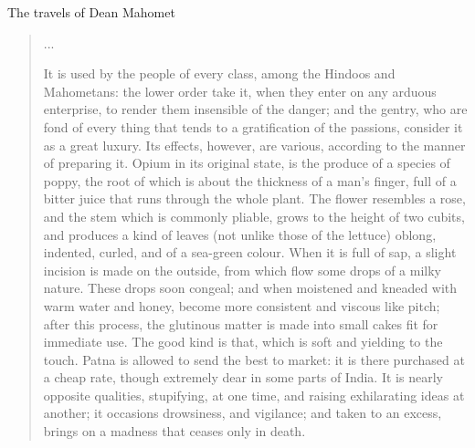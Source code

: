 \begin{texts}{The travels of Dean Mahomet}
\begin{quote}
    ...
    
    It is used by the people of every class, among the Hindoos and Mahometans: the lower order take it, when they enter on any arduous enterprise, to render them insensible of the danger; and the gentry, who are fond of every thing that tends to a gratification of the passions, consider it as a great luxury. Its effects, however, are various, according to the manner of preparing it. Opium in its original state, is the produce of a species of poppy, the root of which is about the thickness of a man's finger, full of a bitter juice that runs through the whole plant. The flower resembles a rose, and the stem which is commonly pliable, grows to the height of two cubits, and produces a kind of leaves (not unlike those of the lettuce) oblong, indented, curled, and of a sea-green colour. When it is full of sap, a slight incision is made on the outside, from which flow some drops of a milky nature. These drops soon congeal; and when moistened and kneaded with warm water and honey, become more consistent and viscous like pitch; after this process, the glutinous matter is made into small cakes fit for immediate use. The good kind is that, which is soft and yielding to the touch. Patna is allowed to send the best to market: it is there purchased at a cheap rate, though extremely dear in some parts of India. It is nearly opposite qualities, stupifying, at one time, and raising exhilarating ideas at another; it occasions drowsiness, and vigilance; and taken to an excess, brings on a madness that ceases only in death.
\end{quote}



\end{texts}

